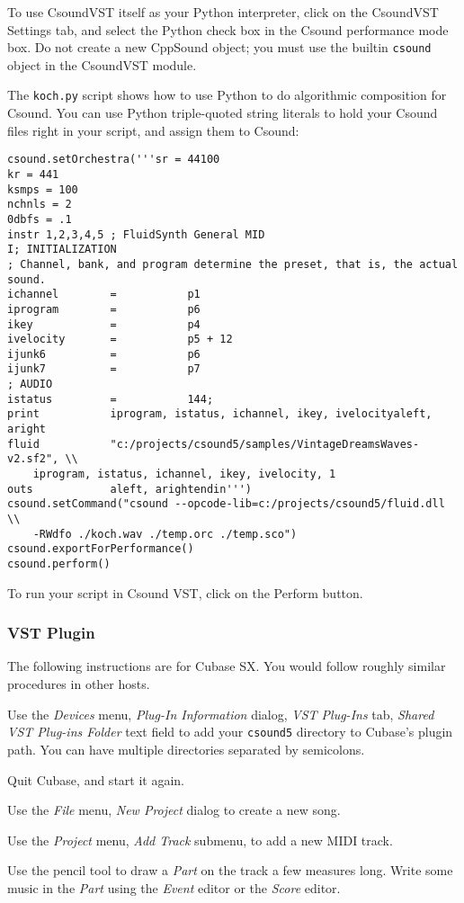 \documentclass[10pt,letterpaper,onecolumn]{ltxguide}
\begin{document}
To use CsoundVST itself as your Python interpreter, click on the CsoundVST Settings tab, and select the Python check box in the Csound performance mode box. Do not create a new CppSound object; you must use the builtin \texttt{csound} object in the CsoundVST module. 

The \texttt{koch.py} script shows how to use Python to do algorithmic composition for Csound. You can use Python triple-quoted string literals to hold your Csound files right in your script, and assign them to Csound: 

\begin{verbatim}
csound.setOrchestra('''sr = 44100
kr = 441
ksmps = 100   
nchnls = 2
0dbfs = .1
instr 1,2,3,4,5 ; FluidSynth General MID
I; INITIALIZATION
; Channel, bank, and program determine the preset, that is, the actual sound.
ichannel		=			p1
iprogram		=			p6
ikey	 		= 			p4
ivelocity 		= 			p5 + 12
ijunk6 			= 			p6
ijunk7			=			p7
; AUDIO
istatus			=			144;			
print			iprogram, istatus, ichannel, ikey, ivelocityaleft, aright		
fluid			"c:/projects/csound5/samples/VintageDreamsWaves-v2.sf2", \\
    iprogram, istatus, ichannel, ikey, ivelocity, 1			
outs 			aleft, arightendin''')
csound.setCommand("csound --opcode-lib=c:/projects/csound5/fluid.dll \\
    -RWdfo ./koch.wav ./temp.orc ./temp.sco")
csound.exportForPerformance()
csound.perform()
\end{verbatim}

To run your script in Csound VST, click on the Perform button. 

\subsubsection{VST Plugin}
The following instructions are for Cubase SX. You would follow roughly similar procedures in other hosts.

Use the \emph{Devices} menu, \emph{Plug-In Information} dialog, \emph{VST Plug-Ins} tab, \emph{Shared VST Plug-ins Folder} text field to add your \texttt{csound5} directory to Cubase's plugin path. You can have multiple directories separated by semicolons. 

Quit Cubase, and start it again. 

Use the \emph{File} menu, \emph{New Project} dialog to create a new song. 

Use the \emph{Project} menu, \emph{Add Track} submenu, to add a new MIDI track. 

Use the pencil tool to draw a \emph{Part} on the track a few measures long. Write some music in the \emph{Part} using the \emph{Event} editor or the \emph{Score} editor. 
\end{document}
